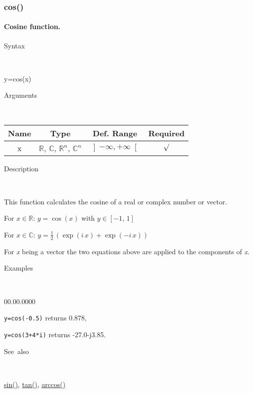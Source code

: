 \newpage
{}


\subsubsection*{\hypertarget{cos}{}{\Large cos()}}


\paragraph{\label{par:Cosine}Cosine function.}

\begin{description}
\item [Syntax]~
\end{description}
y=cos(x)

\begin{description}
\item [Arguments]~
\end{description}
\begin{tabular}{|c|c|c|c|}
\hline 
Name&
Type&
Def. Range&
Required\tabularnewline
\hline
\hline 
x&
$\mathbb{R}$, $\mathbb{C}$, $\mathbb{R}^{n}$, $\mathbb{C}^{n}$&
$\left]-\infty,+\infty\right[$&
$\surd$\tabularnewline
\hline
\end{tabular}

\begin{description}
\item [Description]~
\end{description}
This function calculates the cosine of a real or complex number or
vector.

\medskip{}
For $x\in\mathbb{R}$: $y=\cos\left(x\right)$ with $y\in\left[-1,\,1\right]$

\medskip{}
For $x\in\mathbb{C}$: $y=\frac{1}{2}\,\left(\exp\left(i\, x\right)+\exp\left(-i\, x\right)\right)$
\medskip{}

For \textit{x} being a vector the two equations above are
applied to the components of \textit{x}.

\begin{description}
\item [Examples]~
\end{description}
\begin{lyxlist}{00.00.0000}
\item [\texttt{y=cos(-0.5)}]returns 0.878,
\item [\texttt{y=cos(3+4{*}i)}]returns -27.0-j3.85.
\end{lyxlist}
\begin{description}
\item [See~also]~
\end{description}
\textcolor{blue}{\hyperlink{sin}{sin()}}\textcolor{black}{,} \textcolor{blue}{\hyperlink{tan}{tan()}}\textcolor{black}{,}
\textcolor{blue}{\hyperlink{arccos}{arccos()}}


